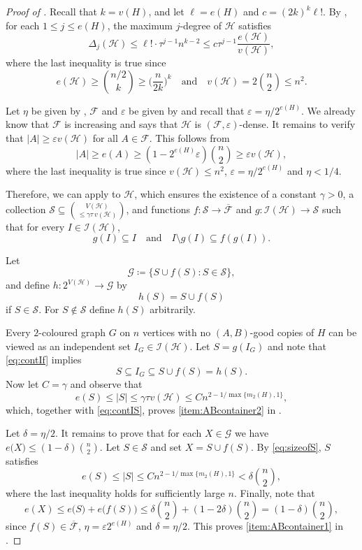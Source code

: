 \documentclass[a4paper,reqno,11pt]{amsart}
\theoremstyle{definition}
\theoremstyle{remark}
\newcommand\cG{\mathcal{G}}
\newcommand\cH{\mathcal{H}}
\newcommand\cI{\mathcal{I}}
\newcommand\cS{\mathcal{S}}
\renewcommand\leq{\leqslant}
\renewcommand\geq{\geqslant}
\renewcommand\le{\leqslant}
\renewcommand\ge{\geqslant}
\renewcommand\to{\rightarrow}
\def\cF{\mathcal{F}}
\begin{document}
\begin{proof}[Proof of ]
Recall that $k=v(H)$, and let $\ell=e(H)$ and $c=(2k)^{k}\ell!$. By , for each $1\leq j\leq e(H)$, the maximum $j$-degree of $\cH$ satisfies
\[\Delta_j(\cH)\leq \ell!\cdot \tau^{j-1} n^{k-2}\leq c  \tau ^{j-1}\frac{e(\cH)}{v(\cH)},\]
where the last inequality is true since
\[e(\cH)\geq \binom{n/2}{k}\ge \bigg(\frac{n}{2k}\bigg)^{k}\quad\text{and}\quad v(\cH)=2\binom{n}{2}\leq n^2.\]

Let $\eta$ be given by , $\cF$ and $\varepsilon$ be given by  and recall that $\varepsilon=\eta/2^{e(H)}$. We already know that $\cF$ is increasing and  says that $\cH$ is $(\cF, \varepsilon)$-dense. It remains to verify that $|A| \ge \varepsilon v(\cH)$ for all $A \in \cF$. This follows from
\[|A| \ge e(A) \ge (1 - 2^{e(H)}\varepsilon)\binom{n}{2} \ge \varepsilon v(\cH),\]
where the last inequality is true since $v(\cH) \le n^2$, $\varepsilon=\eta/2^{e(H)}$ and $\eta<1/4$.

Therefore, we can apply  to $\cH$, which ensures the existence of a constant $\gamma>0$, a collection $\mathcal{S} \subseteq \binom{V(\mathcal{H})}{\le \gamma\tau\, v(\mathcal{H})}$, and functions
$f\colon \cS \to \overline{\cF}$ and $g \colon \cI(\cH) \to \cS$ such that for every $I \in \cI(\cH)$,
\begin{equation}\label{eq:contIf}
g(I) \subseteq I 
\quad \text{and} \quad 
I \setminus g(I) \subseteq f(g(I)).
\end{equation}

Let
\[\cG\coloneqq \{S \cup f(S) : S \in \cS\},\]
and define $h: 2^{V(\cH)} \to \cG$ by
\[h(S) = S \cup f(S)\]
if $S \in \cS$. For $S \not\in \cS$ define $h(S)$ arbitrarily.

Every $2$-coloured graph $G$ on $n$ vertices with no $(A,B)$-good copies of $H$ can be viewed as an independent set $I_G \in \cI(\cH)$. Let $S = g(I_G)$ and note that \eqref{eq:contIf} implies
\begin{equation}\label{eq:contIS}
    S \subseteq I_G \subseteq S \cup f(S)=h(S).
\end{equation}
Now let $C=\gamma$ and observe that
\begin{equation}\label{eq:sizeofS}
e(S) \le |S| \le \gamma\tau v(\cH) \le C n^{2-1/\max\{m_2(H),1\}},
\end{equation}
which, together with \eqref{eq:contIS}, proves \cref{item:ABcontainer2} in .

Let $\delta = \eta/2$. It remains to prove that for each $X\in\cG$ we have $e\big(X\big)\leq (1-\delta)\binom{n}{2}$. Let $S \in \cS$ and set $X=S \cup f(S)$. By \eqref{eq:sizeofS}, $S$ satisfies
\[e(S)\le |S| \leq Cn^{2-1/\max\{m_2(H),1\}}<\delta \binom{n}{2},\]
where the last inequality holds for sufficiently large $n$. Finally, note that
\[e(X) \le e\big(S\big) + e\big(f(S)\big) \leq \delta\binom{n}{2} + (1-2\delta)\binom{n}{2} = (1-\delta)\binom{n}{2},\]
since $f(S) \in \overline{\cF}$, $\eta = \varepsilon2^{e(H)}$ and $\delta=\eta/2$. This proves \cref{item:ABcontainer1} in .
\end{proof}
\end{document}
